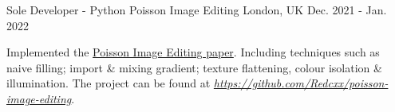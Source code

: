 \begin{cventries}
  


  
  \cventry
    {Sole Developer - Python} %
    {Poisson Image Editing} %
    {London, UK} %
    {Dec. 2021 - Jan. 2022} %
    {
      \begin{cvitems} %
        \item {Implemented the \href{https://www.cs.jhu.edu/~misha/Fall07/Papers/Perez03.pdf}{Poisson Image Editing paper}. Including techniques such as naive filling; import \& mixing gradient; texture flattening, colour isolation \& illumination. The project can be found at \href{https://github.com/Redcxx/poisson-image-editing}{\textit{https://github.com/Redcxx/poisson-image-editing}}.}
      \end{cvitems}
    }


\end{cventries}
